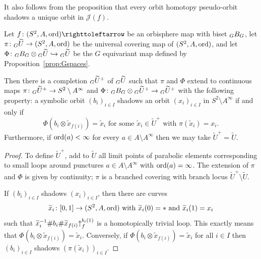 \documentclass{amsart}
\newcommand\Julia{{\mathcal J}}
\begin{document}
It also follows from the proposition that every orbit homotopy
pseudo-orbit shadows a unique orbit in $\Julia(f)$.

\begin{prop}\label{prop:ShadViaUnCover}
  Let $f\colon(S^2,A,\ord)\selfmap$ be an orbisphere map with biset
  $\subscript G B_G$, let
  $\pi\colon\subscript G{\widetilde U}\to (S^2, A,\ord)$ be the
  universal covering map of $(S^2, A,\operatorname{ord})$, and let
  $\Phi\colon\subscript G B_G \otimes \subscript G{\widetilde
    U}\hookrightarrow\subscript G{\widetilde U}$ be the $G$
  equivariant map defined by Proposition~\ref{prop:Gspaces}.

  Then there is a completion $\subscript G{\widetilde U^+}$ of
  $\subscript G{\widetilde U}$ such that $\pi$ and $\Phi$ extend to
  continuous maps
  $\pi\colon\subscript G{\widetilde U^+}\to S^2\setminus A^\infty$ and
  $\Phi\colon\subscript G B_G \otimes \subscript G{\widetilde
    U^+}\to\subscript G{\widetilde U^+}$ with the following property:
  a symbolic orbit $(b_i)_{i\in I}$ shadows an orbit $(x_i)_{i\in I}$
  in $S^2\setminus A^\infty$ if and only if
  \[\Phi(b_i\otimes \widetilde x_{f(i)})=\widetilde x_i \text{ for some }\widetilde x_i\in \widetilde U^+ \text{ with }\pi(\widetilde x_i)=x_i.
  \]
  Furthermore, if $\operatorname{ord}(a)<\infty$ for every
  $a\in A\setminus A^\infty$ then we may take $\widetilde U^+=\widetilde U$.
\end{prop}
\begin{proof}
  To define $\widetilde U^+$, add to $\widetilde U$ all limit points
  of parabolic elements corresponding to small loops around punctures
  $a\in A\setminus A^\infty$ with
  $\operatorname{ord}(a)=\infty$. The extension of $\pi$ and
  $\Phi$ is given by continuity; $\pi$ is a branched covering with
  branch locus $\widetilde U^+\setminus\widetilde U$.

  If $(b_i)_{i\in I}$ shadows $(x_i)_{i\in I}$, then there are
  curves
  \[\widetilde x_i\colon[0,1]\to (S^2,A,\operatorname{ord})\text{ with }\widetilde x_i(0)=*
    \text{ and }\widetilde x_i(1)=x_i
  \]
  such that
  $\widetilde x_i^{-1}\#b_i\#\widetilde x_{f(i)}{\uparrow}_{f}^{b_i(1)}$ is
  a homotopically trivial loop. This exactly means that
  $\Phi(b_i\otimes\widetilde x_{f(i)})=\widetilde x_i$. Conversely, if
  $\Phi(b_i\otimes\widetilde x_{f(i)})=\widetilde x_i$ for all
  $i\in I$ then $(b_i)_{i\in I}$ shadows
  $(\pi(\widetilde x_i))_{i\in I}$.
\end{proof}
\end{document}
